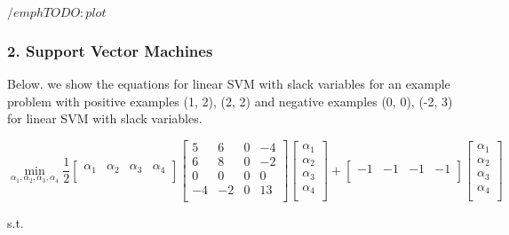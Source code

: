 \documentclass[10pt]{article}
\begin{document}
$/emph{TODO: plot}$


\subsubsection*{2. Support Vector Machines}

Below. we show the equations for linear SVM with slack variables for an example problem with 
positive examples (1, 2), (2, 2) and negative examples (0, 0), (-2, 3) for linear SVM with slack variables. 


\[
\min_{\alpha_1, \alpha_2, \alpha_3, \alpha_4}
\frac{1}{2}
\begin{bmatrix}
    \alpha_1 & \alpha_2 & \alpha_3 & \alpha_4 \\
\end{bmatrix}
\begin{bmatrix}
    5       & 6 & 0 & -4 \\
    6       & 8 & 0 & -2 \\
    0       & 0 & 0 & 0 \\
    -4       & -2 & 0 & 13 \\
\end{bmatrix}
\begin{bmatrix}
    \alpha_1 \\
    \alpha_2 \\
    \alpha_3 \\
    \alpha_4 \\
\end{bmatrix} 
+
\begin{bmatrix}
    -1       & -1 & -1 & -1 \\
\end{bmatrix}
\begin{bmatrix}
    \alpha_1 \\
    \alpha_2 \\
    \alpha_3 \\
    \alpha_4 \\
\end{bmatrix} 
\]

\begin{center}
s.t.
\end{center}
\end{document}
